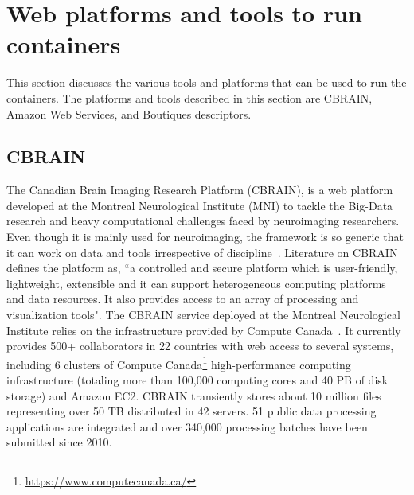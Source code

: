 \section{Web platforms and tools to run containers}\label{web_platforms}
This section discusses the various tools and platforms that can be used to run the containers. The platforms and tools described in this section are CBRAIN, Amazon Web Services, and Boutiques descriptors.
\subsection{CBRAIN}
The Canadian Brain Imaging Research Platform (CBRAIN), is a web 
platform developed at the Montreal Neurological Institute (MNI) to 
tackle the Big-Data research and heavy computational challenges faced 
by neuroimaging researchers. Even though it is mainly used for 
neuroimaging, the framework is so generic that it can work on data and 
tools irrespective of discipline~\cite{DBLP:journals/fini/DasGRSPMSRSKMKR17}. Literature on
CBRAIN~\cite{DBLP:journals/fini/DasGRSPMSRSKMKR17} defines the platform 
as, ``a controlled and secure platform which is user-friendly, 
lightweight, extensible and it can support heterogeneous computing 
platforms and data resources. It also provides access to an array of 
processing and visualization tools". The CBRAIN service deployed at the 
Montreal Neurological Institute relies on the infrastructure provided 
by Compute Canada~\cite{DAS20161188}. It currently provides 500+ 
collaborators in 22 countries with web access to several systems, 
including 6 clusters of Compute Canada\footnote{\url{https://www.computecanada.ca/}} high-performance
computing infrastructure (totaling more than 100,000 computing cores 
and 40 PB of disk storage) and Amazon EC2. CBRAIN transiently stores 
about 10 million files representing over 50 TB distributed in 42 
servers. 51 public data processing applications are integrated and over 
340,000 processing batches have been submitted since 2010.

